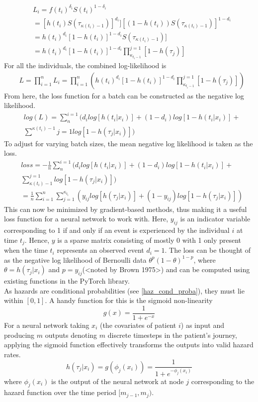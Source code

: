 \documentclass[%
 reprint,
 amsmath,amssymb,
 aps,
]{revtex4-2}
\begin{document}
\begin{align*}
&L_i = f(t_i)^{\delta_i}S(t_i)^{1-\delta_i}\\
&= [h(t_i)S(\tau_{\kappa(t_i)-1})]^{d_i}][(1-h(t_i))S(\tau_{\kappa(t_i)-1})]^{1-d_i}\\
&= h(t_i)^{d_i}[1 - h(t_i)]^{1-d_i}S(\tau_{\kappa(t_i)-1})]\\
&= h(t_i)^{d_i}[1 - h(t_i)]^{1-d_i} \prod^{j=1}_{\kappa_{t_i-1}}[1 - h(\tau_j)]
\end{align*}
For all the individuals, the combined log-likelihood is
\begin{align*}
&L = \prod^{n}_{i=1}L_i = \prod^{n}_{i=1}\left(h(t_i)^{d_i}[1 - h(t_i)]^{1-d_i} \prod^{j=1}_{\kappa_{t_i-1}}[1 - h(\tau_j)]\right)
\end{align*}
From here, the loss function for a batch can be constructed as the negative log likelihood.
\begin{align*}
&log(L) = \sum^{i=1}_{n}\Bigg(d_i log[h(t_i|x_i)]+(1-d_i)log[1-h(t_i|x_i)]+\\
&\sum^{\kappa(t_i)-1}{j=1}log[1 - h(\tau_j|x_i)] \Bigg)
\end{align*}
To adjust for varying batch sizes, the mean negative log likelihood is taken as the loss.
\begin{align*}
&loss = -\frac{1}{n}\sum^{i=1}_{n}\Bigg(d_i log[h(t_i|x_i)]+(1-d_i)log[1-h(t_i|x_i)]+\\
&\sum^{j=1}_{\kappa(t_i)-1}log[1 - h(\tau_j|x_i)] \Bigg) \\
&= \frac{1}{n}\sum^{n}_{i=1}\sum^{\kappa_{t_i}}_{j=1}(y_{ij}log[h(\tau_j|x_i)]+(1-y_{ij})log[1-h(\tau_j|x_i)])
\end{align*}
This can now be minimized by gradient-based methods, thus making it a useful loss function for a neural network to work with. Here, $y_{ij}$ is an indicator variable corresponding to 1 if and only if an event is experienced by the individual $i$ at time $t_j$. Hence, $y$ is a sparse matrix consisting of mostly 0 with 1 only present when the time $t_i$ represents an observed event $d_i = 1$. The loss can be thought of as the negative log likelihood of Bernoulli data $\theta^p(1-\theta)^{1-p}$, where $\theta=h(\tau_j|x_i)$ and $p=y_{ij}$(<noted by Brown 1975>) and can be computed using existing functions in the PyTorch library.\\

As hazards are conditional probabilities (see \ref{haz_cond_proba}), they must lie within $[0,1]$. A handy function for this is the sigmoid non-linearity
\[
g(x) = \frac{1}{1+e^{-x}}
\]
For a neural network taking $x_i$ (the covariates of patient $i$) as input and producing $m$ outputs denoting $m$ discrete timesteps in the patient's journey, applying the sigmoid function effectively transforms the outputs into valid hazard rates.
\[
h(\tau_j|x_i) = g(\phi_j(x_i)) = \frac{1}{1+e^{-\phi_j(x_i)}}
\]
where $\phi_j(x_i)$ is the output of the neural network at node $j$ corresponding to the hazard function over the time period $[m_{j-1}, m_j)$.

\cite{*}

\end{document}
